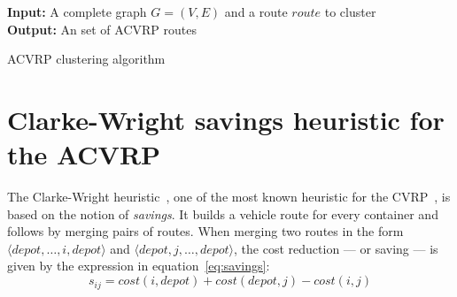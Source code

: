 \begin{algorithm}[h!]
  \textbf{Input:} A complete graph $G=(V,E)$ and a route $route$ to cluster \\
  \textbf{Output:} An set of ACVRP routes
  \begin{algorithmic}[1]
    \ENDFOR

        \ENDIF
      \ENDFOR
    \ENDFOR

      \ENDFOR

    \ENDWHILE

  \end{algorithmic}
  \caption{ACVRP clustering algorithm}
  \label{algorithm:clustering}
\end{algorithm}

\newpage

\section{Clarke-Wright savings heuristic for the ACVRP}
\label{section:savings}


The Clarke-Wright heuristic~\citep{Clarke1964}, one of the most known heuristic
for the CVRP~\citep{Laporte01}, is based on the notion of \textit{savings}. It
builds a vehicle route for every container and follows by merging pairs of
routes. When merging two routes in the form $\langle depot, \ldots, i, depot
\rangle$ and $\langle depot, j, \ldots, depot \rangle$, the cost reduction ---
or saving --- is given by the expression in equation~\ref{eq:savings}:
\begin{equation}
  s_{ij} = cost(i, depot) + cost(depot, j) - cost(i, j)
  \label{eq:savings}
\end{equation}

